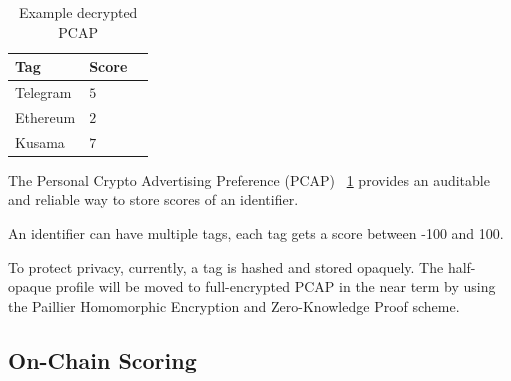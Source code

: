 \documentclass[twoside,twocolumn]{article}
\begin{document}
\begin{table}
    \centering
    \begin{tabular}{llr}
        \toprule
        Tag      & Score \\
        \midrule
        Telegram & $5$   \\
        Ethereum & $2$   \\
        Kusama   & $7$   \\
        \bottomrule
    \end{tabular}
    \caption{Example decrypted PCAP}
    \label{table:examplePCAP}
\end{table}

The Personal Crypto Advertising Preference (PCAP) ~\ref{table:examplePCAP} \cite{ref2}
provides an auditable and reliable way to store scores of an identifier.

An identifier can have multiple tags, each tag gets a score between -100 and 100.

To protect privacy, currently, a tag is hashed and stored opaquely.
The half-opaque profile will be moved to full-encrypted PCAP in the near term
by using the Paillier\cite{ref3} Homomorphic Encryption and Zero-Knowledge Proof scheme.

\subsection{On-Chain Scoring}
\end{document}

